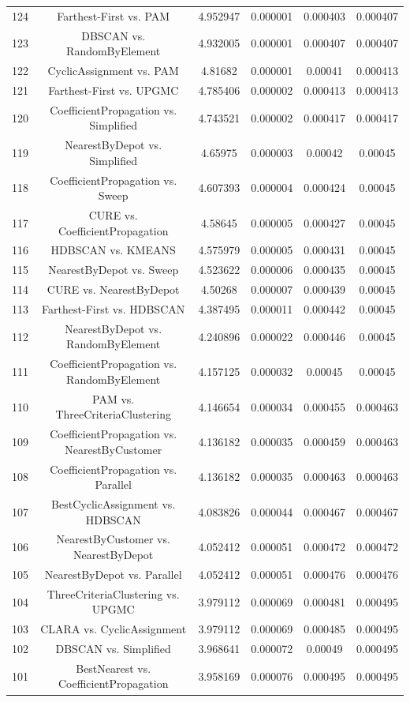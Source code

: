 \documentclass[a4paper,10pt]{article}
\begin{document}
\begin{landscape}
\begin{table}[!htp]
\begin{tabular}{cccccc}
124&Farthest-First vs. PAM&4.952947&0.000001&0.000403&0.000407\\
123&DBSCAN vs. RandomByElement&4.932005&0.000001&0.000407&0.000407\\
122&CyclicAssignment vs. PAM&4.81682&0.000001&0.00041&0.000413\\
121&Farthest-First vs. UPGMC&4.785406&0.000002&0.000413&0.000413\\
120&CoefficientPropagation vs. Simplified&4.743521&0.000002&0.000417&0.000417\\
119&NearestByDepot vs. Simplified&4.65975&0.000003&0.00042&0.00045\\
118&CoefficientPropagation vs. Sweep&4.607393&0.000004&0.000424&0.00045\\
117&CURE vs. CoefficientPropagation&4.58645&0.000005&0.000427&0.00045\\
116&HDBSCAN vs. KMEANS&4.575979&0.000005&0.000431&0.00045\\
115&NearestByDepot vs. Sweep&4.523622&0.000006&0.000435&0.00045\\
114&CURE vs. NearestByDepot&4.50268&0.000007&0.000439&0.00045\\
113&Farthest-First vs. HDBSCAN&4.387495&0.000011&0.000442&0.00045\\
112&NearestByDepot vs. RandomByElement&4.240896&0.000022&0.000446&0.00045\\
111&CoefficientPropagation vs. RandomByElement&4.157125&0.000032&0.00045&0.00045\\
110&PAM vs. ThreeCriteriaClustering&4.146654&0.000034&0.000455&0.000463\\
109&CoefficientPropagation vs. NearestByCustomer&4.136182&0.000035&0.000459&0.000463\\
108&CoefficientPropagation vs. Parallel&4.136182&0.000035&0.000463&0.000463\\
107&BestCyclicAssignment vs. HDBSCAN&4.083826&0.000044&0.000467&0.000467\\
106&NearestByCustomer vs. NearestByDepot&4.052412&0.000051&0.000472&0.000472\\
105&NearestByDepot vs. Parallel&4.052412&0.000051&0.000476&0.000476\\
104&ThreeCriteriaClustering vs. UPGMC&3.979112&0.000069&0.000481&0.000495\\
103&CLARA vs. CyclicAssignment&3.979112&0.000069&0.000485&0.000495\\
102&DBSCAN vs. Simplified&3.968641&0.000072&0.00049&0.000495\\
101&BestNearest vs. CoefficientPropagation&3.958169&0.000076&0.000495&0.000495\\

\end{tabular}
\end{table}
\end{landscape}
\end{document}
